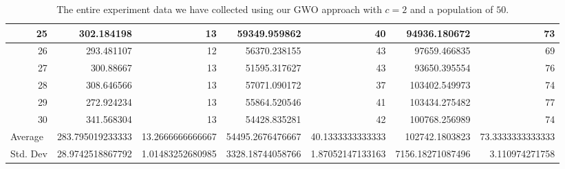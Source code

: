 \begin{table}
\begin{adjustwidth}{}{}
{{\begin{tabular}{|r|r|r|r|r|r|r|}
					\hline
					25                                         & 302.184198                   & 13                                    & 59349.959862                   & 40                                    & 94936.180672                 & 73                                     \\ 
					\hline
					26                                         & 293.481107                   & 12                                    & 56370.238155                   & 43                                    & 97659.466835                 & 69                                     \\ 
					\hline
					27                                         & 300.88667                    & 13                                    & 51595.317627                   & 43                                    & 93650.395554                 & 76                                     \\ 
					\hline
					28                                         & 308.646566                   & 13                                    & 57071.090172                   & 37                                    & 103402.549973                & 74                                     \\ 
					\hline
					29                                         & 272.924234                   & 13                                    & 55864.520546                   & 41                                    & 103434.275482                & 77                                     \\ 
					\hline
					30                                         & 341.568304                   & 13                                    & 54428.835281                   & 42                                    & 100768.256989                & 74                                     \\ 
					\hline
					\multicolumn{1}{|l|}{Average}              & 283.795019233333             & 13.2666666666667                      & 54495.2676476667               & 40.1333333333333                      & 102742.1803823               & 73.3333333333333                       \\ 
					\hline
					\multicolumn{1}{|l|}{Std. Dev}             & 28.9742518867792             & 1.01483252680985                      & 3328.18744058766               & 1.87052147133163                      & 7156.18271087496             & 3.110974271758                         \\
					\hline
		\end{tabular}}}
	\end{adjustwidth}
	\caption{The entire experiment data we have collected using our GWO approach with $c = 2$ and a population of $50$.}
	\label{full-data-gwo-c2-p50}
\end{table}

